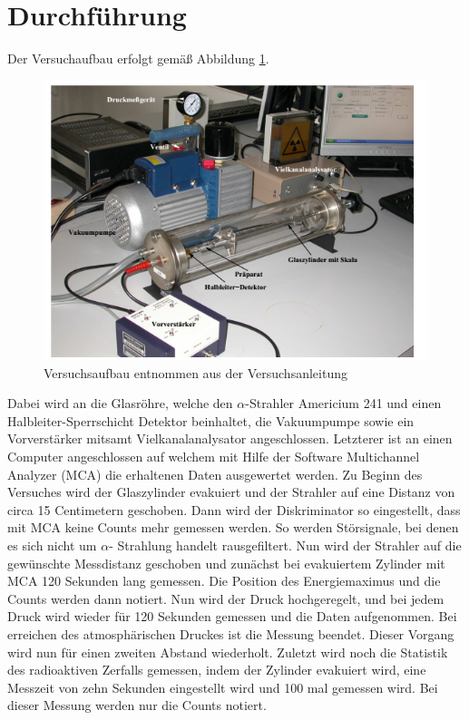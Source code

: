 \section{Durchführung}
\label{sec:Durchführung}
Der Versuchaufbau erfolgt gemäß Abbildung \ref{fig:aufbau}.
\begin{figure}
  \centering
  \includegraphics{images/aufbau.png}
  \caption{Versuchsaufbau entnommen aus der Versuchsanleitung \cite{1}}
  \label{fig:aufbau}
\end{figure}
Dabei wird an die Glasröhre, welche den $\alpha$-Strahler Americium 241 und einen Halbleiter-Sperrschicht Detektor beinhaltet, die Vakuumpumpe sowie ein Vorverstärker mitsamt Vielkanalanalysator angeschlossen.
Letzterer ist an einen Computer angeschlossen auf welchem mit Hilfe der Software Multichannel Analyzer (MCA) die erhaltenen Daten ausgewertet werden.
Zu Beginn des Versuches wird der Glaszylinder evakuiert und der Strahler auf eine Distanz von circa 15 Centimetern geschoben.
Dann wird der Diskriminator so eingestellt, dass mit MCA keine Counts mehr gemessen werden. So werden Störsignale, bei denen es sich nicht um $\alpha$- Strahlung handelt
rausgefiltert. Nun wird der Strahler auf die gewünschte Messdistanz geschoben und zunächst bei evakuiertem Zylinder mit MCA 120 Sekunden lang gemessen. Die Position des
Energiemaximus und die Counts werden dann notiert. Nun wird der Druck hochgeregelt, und bei jedem Druck wird wieder für 120 Sekunden gemessen und die Daten aufgenommen.
Bei erreichen des atmosphärischen Druckes ist die Messung beendet. Dieser Vorgang wird nun für einen zweiten Abstand wiederholt.
Zuletzt wird noch die Statistik des radioaktiven Zerfalls gemessen, indem der Zylinder evakuiert wird, eine Messzeit von zehn Sekunden eingestellt wird und 100 mal gemessen wird.
Bei dieser Messung werden nur die Counts notiert.
